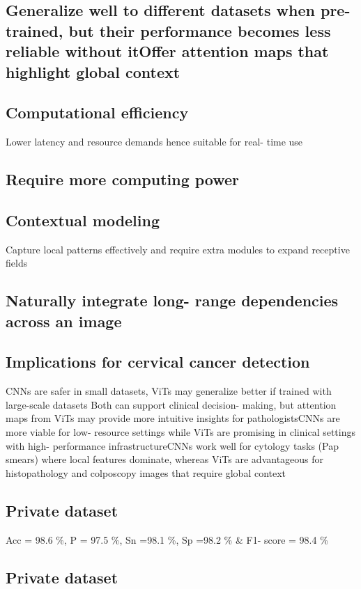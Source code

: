 \documentclass{svjour3}
\begin{document}
\subsection{Generalize well to different datasets when pre-trained, but their performance becomes less reliable without itOffer attention maps that highlight global context}
\subsection{Computational efficiency}
Lower latency and resource demands hence suitable for real- time use
\subsection{Require more computing power}
\subsection{Contextual modeling}
Capture local patterns effectively and require extra modules to expand receptive fields
\subsection{Naturally integrate long- range dependencies across an image}
\subsection{Implications for cervical cancer detection}
CNNs are safer in small datasets, ViTs may generalize better if trained with large-scale datasets
Both can support clinical decision- making, but attention maps from ViTs may provide more intuitive insights for pathologistsCNNs are more viable for low- resource settings while ViTs are promising in clinical settings with high- performance infrastructureCNNs work well for cytology tasks (Pap smears) where local features dominate, whereas ViTs are advantageous for histopathology and colposcopy images that require global context
\subsection{Private dataset}
Acc = 98.6 \%, P = 97.5 \%, Sn =98.1 \%, Sp =98.2 \% \& F1- score = 98.4 \%
\subsection{Private dataset}
\end{document}
